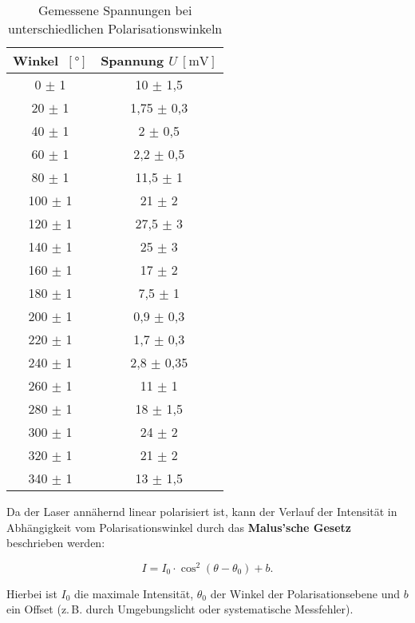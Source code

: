 \begin{table}[htbp]
    \centering
    \begin{tabular}{c|c}
        Winkel \(~[\text{°}]\) & Spannung \(U~[\text{mV}]\) \\
        \hline
        0 \(\pm\) 1 & 10 \(\pm\) 1{,}5 \\
        20 \(\pm\) 1 & 1{,}75 \(\pm\) 0{,}3 \\
        40 \(\pm\) 1 & 2 \(\pm\) 0{,}5 \\
        60 \(\pm\) 1 & 2{,}2 \(\pm\) 0{,}5 \\
        80 \(\pm\) 1 & 11{,}5 \(\pm\) 1 \\
        100 \(\pm\) 1 & 21 \(\pm\) 2 \\
        120 \(\pm\) 1 & 27{,}5 \(\pm\) 3 \\
        140 \(\pm\) 1 & 25 \(\pm\) 3 \\
        160 \(\pm\) 1 & 17 \(\pm\) 2 \\
        180 \(\pm\) 1 & 7{,}5 \(\pm\) 1 \\
        200 \(\pm\) 1 & 0{,}9 \(\pm\) 0{,}3 \\
        220 \(\pm\) 1 & 1{,}7 \(\pm\) 0{,}3 \\
        240 \(\pm\) 1 & 2{,}8 \(\pm\) 0{,}35 \\
        260 \(\pm\) 1 & 11 \(\pm\) 1 \\
        280 \(\pm\) 1 & 18 \(\pm\) 1{,}5 \\
        300 \(\pm\) 1 & 24 \(\pm\) 2 \\
        320 \(\pm\) 1 & 21 \(\pm\) 2 \\
        340 \(\pm\) 1 & 13 \(\pm\) 1{,}5 \\
    \end{tabular}
    \caption{Gemessene Spannungen bei unterschiedlichen Polarisationswinkeln}
    \label{tab:Wellenlaenge}
\end{table}

Da der Laser annähernd linear polarisiert ist, kann der Verlauf der Intensität in Abhängigkeit vom Polarisationswinkel durch das \textbf{Malus’sche Gesetz} \cite{Malus} beschrieben werden:

\begin{equation*}
    I = I_0 \cdot \cos^2(\theta - \theta_0) + b .
\end{equation*}

Hierbei ist $I_0$ die maximale Intensität, $\theta_0$ der Winkel der Polarisationsebene und $b$ ein Offset (z.\,B. durch Umgebungslicht oder systematische Messfehler).

